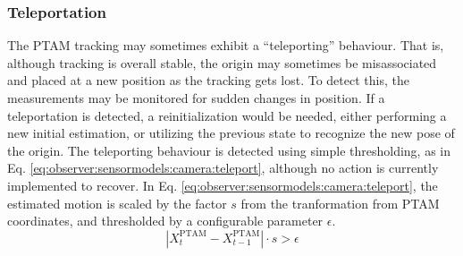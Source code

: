     \subsubsection{Teleportation}
        \label{sssec:observer:sensormodels:camera:teleportation}
        The PTAM tracking may sometimes exhibit a ``teleporting'' behaviour.
        That is, although tracking is overall stable, the origin may
        sometimes be misassociated and placed at a new position as the
        tracking gets lost.
        To detect this, the measurements may be monitored for sudden changes in position.
        If a teleportation is detected, a reinitialization would be needed,
        either performing a new initial estimation, or utilizing the previous state
        to recognize the new pose of the origin.
        The teleporting behaviour is detected using simple thresholding,
        as in Eq. \eqref{eq:observer:sensormodels:camera:teleport},
        although no action is currently implemented to recover.
        In Eq. \eqref{eq:observer:sensormodels:camera:teleport}, the
        estimated motion is scaled by the factor $s$ from the tranformation
        from PTAM coordinates, and thresholded by a configurable parameter $\epsilon$.
        \begin{equation}
            \label{eq:observer:sensormodels:camera:teleport}
            \left|X^{\text{PTAM}}_{t} - X^{\text{PTAM}}_{t-1}\right| \cdot s > \epsilon
        \end{equation}
